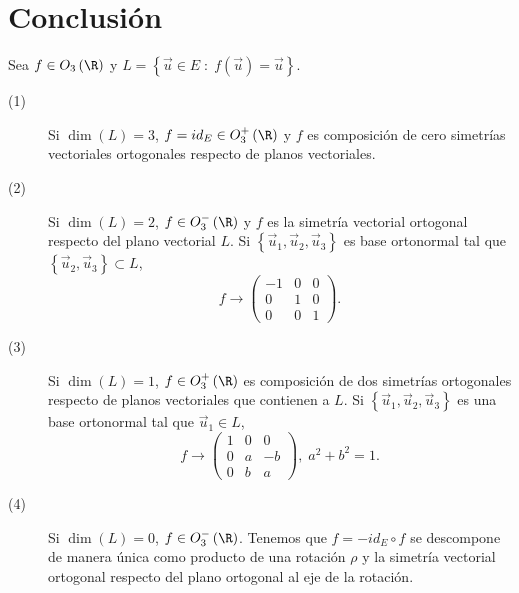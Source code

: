 \section*{Conclusión}
Sea $\displaystyle f \in O_{3}\left(\R\right) $ y $\displaystyle L = \left\{ \vec{u}\in E \; : \; f\left(\vec{u}\right) = \vec{u}\right\}  $.
\begin{description}
\item[(1)] Si $\displaystyle \dim\left(L\right) = 3 $, $\displaystyle f = id _{E} \in O^{+}_{3}\left(\R\right) $ y $\displaystyle f $ es composición de cero simetrías vectoriales ortogonales respecto de planos vectoriales.
\item[(2)] Si $\displaystyle \dim\left(L\right) = 2 $, $\displaystyle f \in O_{3}^{-}\left(\R\right) $ y $\displaystyle f $ es la simetría vectorial ortogonal respecto del plano vectorial $\displaystyle L $. Si $\displaystyle \left\{ \vec{u}_{1}, \vec{u}_{2}, \vec{u}_{3}\right\}  $ es base ortonormal tal que $\displaystyle \left\{ \vec{u}_{2}, \vec{u}_{3}\right\}\subset L $,
	\[f \to \begin{pmatrix} -1 & 0 & 0 \\
	0 & 1 & 0 \\
0 & 0 & 1\end{pmatrix} .\]
\item[(3)] Si $\displaystyle \dim\left(L\right) = 1 $, $\displaystyle f \in O^{+}_{3}\left(\R\right) $ es composición de dos simetrías ortogonales respecto de planos vectoriales que contienen a $\displaystyle L $. Si $\displaystyle \left\{ \vec{u}_{1}, \vec{u}_{2}, \vec{u}_{3}\right\}  $ es una base ortonormal tal que $\displaystyle \vec{u}_{1} \in L $,
		\[f \to \begin{pmatrix} 1 & 0 & 0 \\
		0 & a & - b \\
	0 & b & a\end{pmatrix}, \; a^{2} + b^{2} = 1 .\]
\item[(4)] Si $\displaystyle \dim\left(L\right)= 0 $, $\displaystyle f \in O^{-}_{3}\left(\R\right) $. Tenemos que $\displaystyle f = - id _{E} \circ f $ se descompone de manera única como producto de una rotación $\displaystyle \rho $ y la simetría vectorial ortogonal respecto del plano ortogonal al eje de la rotación. 
\end{description}

